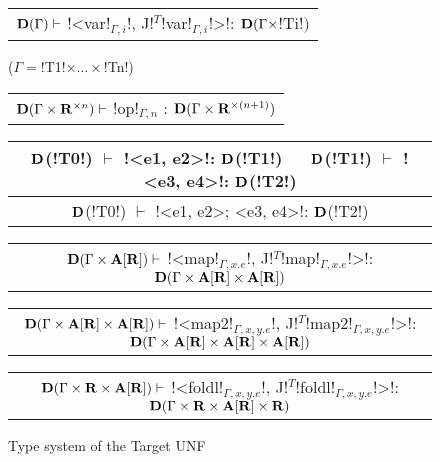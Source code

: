 \begin{figure*}[tb]
    \centering
    \begin{tabular}{c} 
    \\\hline
    $\mathbf{D}(\Gamma) \vdash$ !<var!$_{\Gamma,i}$!, J!$^T$!var!$_{\Gamma,i}$!>!: $\mathbf{D}(\Gamma\times$!Ti!$)$ 
    \end{tabular}($\Gamma=$!T1!$\times\ldots\times$!Tn!)
    \hspace{0.5cm}
    \begin{tabular}{c}
        \\\hline
        $\mathbf{D}(\Gamma\times\mathbf{R}^{\times n}) \vdash$ !op!$_{\Gamma,n}$ : $\mathbf{D}(\Gamma\times\mathbf{R}^{\times(n+1)})$
    \end{tabular}

    \begin{tabular}{c}
    $\mathbf{D}$(!T0!) $\vdash$ !<e1, e2>!: $\mathbf{D}$(!T1!) $\quad$ $\mathbf{D}$(!T1!) $\vdash$ !<e3, e4>!: $\mathbf{D}$(!T2!) \\\hline
    $\mathbf{D}$(!T0!) $\vdash$ !<e1, e2>; <e3, e4>!: $\mathbf{D}$(!T2!)
    \end{tabular}

    \begin{tabular}{c}
        \\\hline  
        $\mathbf{D}(\Gamma \times \mathbf{A}[\mathbf{R}]) \vdash$ !<map!$_{\Gamma,x.e}$!, J!$^T$!map!$_{\Gamma,x.e}$!>!: $\mathbf{D}(\Gamma \times \mathbf{A}[\mathbf{R}] \times \mathbf{A}[\mathbf{R}])$
    \end{tabular}

    \begin{tabular}{c}
        \\\hline  
        $\mathbf{D}(\Gamma \times \mathbf{A}[\mathbf{R}] \times \mathbf{A}[\mathbf{R}])\vdash$ !<map2!$_{\Gamma,x,y.e}$!, J!$^T$!map2!$_{\Gamma,x,y.e}$!>!: $\mathbf{D}(\Gamma \times \mathbf{A}[\mathbf{R}] \times \mathbf{A}[\mathbf{R}] \times \mathbf{A}[\mathbf{R}])$
    \end{tabular}

    \begin{tabular}{c}
        \\\hline  
        $\mathbf{D}(\Gamma \times \mathbf{R}\times\mathbf{A}[\mathbf{R}])\vdash$ !<foldl!$_{\Gamma,x,y.e}$!, J!$^T$!foldl!$_{\Gamma,x,y.e}$!>!: $\mathbf{D}(\Gamma \times \mathbf{R}\times \mathbf{A}[\mathbf{R}] \times \mathbf{R})$
    \end{tabular}
    \vspace{-0.2cm}
    \caption{Type system of the Target UNF}
    \vspace{-0.4cm}
    \label{fig:target_unf_typesystem}
    \end{figure*}